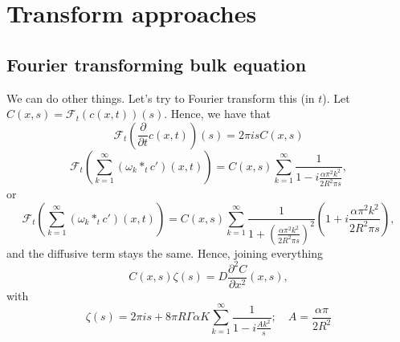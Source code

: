 \documentclass[]{article}
\newcommand{\pderiv}[2]{\frac{\partial #1}{\partial #2}}
\begin{document}
\section{Transform approaches}
\subsection{Fourier transforming bulk equation}
We can do other things. Let's try to Fourier transform this (in $t$). Let $C(x,s) = \mathcal{F}_t(c(x,t))(s)$. Hence, we have that
\begin{equation}
\mathcal{F}_t\left(\pderiv{}{t}c(x,t) \right)(s) = 2 \pi i s C(x,s)
\end{equation}
\begin{equation}
\mathcal{F}_t\left(\sum_{k=1}^\infty (\omega_k *_t c')(x,t)\right) = C(x,s) \sum_{k=1}^\infty \frac{1}{1 - i\frac{\alpha \pi^2 k^2}{2 R^2 \pi s}},
\end{equation}
or
\begin{equation}
\mathcal{F}_t\left(\sum_{k=1}^\infty (\omega_k *_t c')(x,t)\right) = C(x,s) \sum_{k=1}^\infty \frac{1}{1 + \left(\frac{\alpha \pi^2 k^2}{2 R^2 \pi s}\right)^2}\left(1 + i\frac{\alpha \pi^2 k^2}{2 R^2 \pi s}\right),
\end{equation}
and the diffusive term stays the same. Hence, joining everything
\begin{equation}
C(x,s) \zeta(s) = D \frac{\partial^2 C}{\partial x^2}(x,s),
\end{equation}
with
\begin{equation}
\zeta(s) = 2 \pi i s + 8 \pi R \Gamma \alpha K \sum_{k=1}^\infty \frac{1}{1 - i \frac{A k^2}{s}}; \quad A = \frac{\alpha \pi}{2 R^2}
\end{equation}
\end{document}
